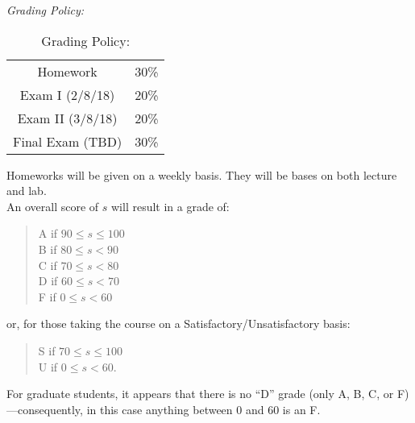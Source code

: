 \documentclass[11pt]{article}
\begin{document}
\emph{Grading Policy:} 

\begin{table}[ht]
\caption{Grading Policy:}
\begin{center}
\begin{tabular}{cc}
Homework &30\%\\
Exam I (2/8/18) &20\%\\
Exam  II (3/8/18) & 20\%\\
Final Exam  (TBD) & 30\%\\
\end{tabular}
\end{center}
\label{default}
\end{table}%

%
%

Homeworks will be given on a weekly basis. They will be bases on both lecture and lab. \\

An overall score of $s$ will result in a grade of:
\begin{quote}
A if $90\leq s\leq 100$ \\
B if $80\leq s < 90$ \\
C if $70\leq s < 80$ \\
D if $60\leq s < 70$ \\
F if $0\leq s < 60$
\end{quote}
or, for those taking the course on a Satisfactory/Unsatisfactory basis:
\begin{quote}
S if $70\leq s\leq 100$ \\
U if $0\leq s < 60$.
\end{quote}
For graduate students, it appears that there is no ``D'' grade (only A, B, C, or F)---consequently, in this case anything between $0$ and $60$ is an F. \\
\end{document}
